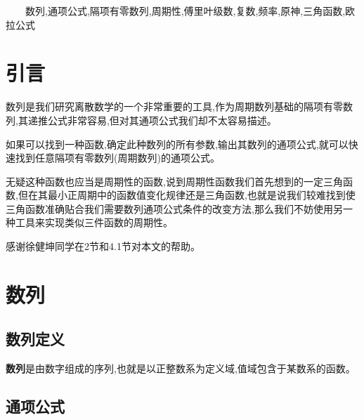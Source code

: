 \documentclass[final,3p,times,onecolumn]{elsarticle}
\begin{document}
\begin{frontmatter}
\begin{keyword}

$\qquad$数列,\:通项公式,\:隔项有零数列,\:周期性,\:傅里叶级数,\:复数,\:频率,\:原神,\:三角函数,\:欧拉公式



\end{keyword}

\end{frontmatter}


\section*{引言}

数列是我们研究离散数学的一个非常重要的工具,作为周期数列基础的隔项有零数列,其递推公式非常容易,但对其通项公式我们却不太容易描述。

如果可以找到一种函数,确定此种数列的所有参数,输出其数列的通项公式,就可以快速找到任意隔项有零数列(周期数列)的通项公式。

无疑这种函数也应当是周期性的函数,说到周期性函数我们首先想到的一定三角函数,但在其最小正周期中的函数值变化规律还是三角函数,也就是说我们较难找到使三角函数准确贴合我们需要数列通项公式条件的改变方法,那么我们不妨使用另一种工具来实现类似三件函数的周期性。

感谢徐健坤同学在2节和4.1节对本文的帮助。

\newpage

\tableofcontents

\newpage

\section{数列}

\subsection{数列定义}

\textbf{数列}是由数字组成的序列,也就是以正整数系为定义域,值域包含于某数系的函数。

\subsection{通项公式}
\end{document}
